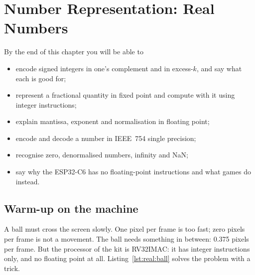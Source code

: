 \chapter{Number Representation: Real Numbers}
\label{ch:reals}


\begin{chapgoals}
By the end of this chapter you will be able to
\begin{itemize}
\item encode signed integers in one's complement and in excess-$k$, and say what each is good for;
\item represent a fractional quantity in fixed point and compute with it using integer instructions;
\item explain mantissa, exponent and normalisation in floating point;
\item encode and decode a number in IEEE~754 single precision;
\item recognise zero, denormalised numbers, infinity and NaN;
\item say why the ESP32-C6 has no floating-point instructions and what \prg games do instead.
\end{itemize}
\end{chapgoals}


\section{Warm-up on the machine}

A ball must cross the screen slowly. One pixel per frame is too fast; zero
pixels per frame is not a movement. The ball needs something in between:
0.375 pixels per frame. But the processor of the kit is RV32IMAC: it has
integer instructions only, and no floating point at all.
Listing~\ref{lst:real:ball} solves the problem with a trick.


